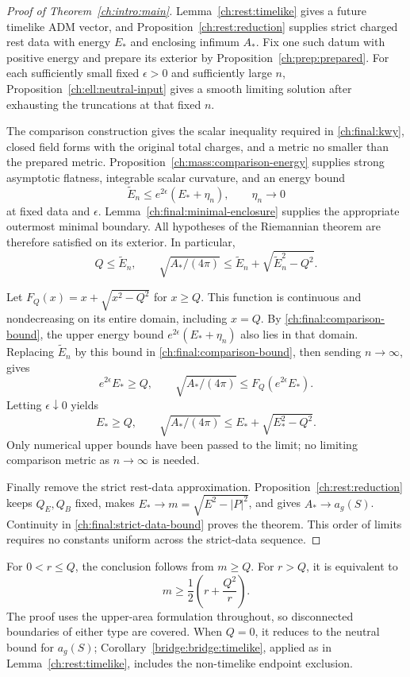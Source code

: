 \begin{proof}[Proof of Theorem~\ref{ch:intro:main}]
Lemma~\ref{ch:rest:timelike} gives a future timelike ADM vector, and
Proposition~\ref{ch:rest:reduction} supplies strict charged rest data
with energy $E_*$ and enclosing infimum $A_*$. Fix one such datum with positive energy and prepare its exterior by Proposition~\ref{ch:prep:prepared}. For each sufficiently small fixed $\epsilon>0$ and sufficiently large $n$, Proposition~\ref{ch:ell:neutral-input} gives a smooth limiting solution after exhausting the truncations at that fixed $n$.

The comparison construction gives the scalar inequality required in \eqref{ch:final:kwy}, closed field forms with the original total charges, and a metric no smaller than the prepared metric. Proposition~\ref{ch:mass:comparison-energy} supplies strong asymptotic flatness, integrable scalar curvature, and an energy bound
\[
 \widetilde E_n\le e^{2\epsilon}(E_*+\eta_n),
 \qquad \eta_n\longrightarrow0
\]
at fixed data and $\epsilon$. Lemma~\ref{ch:final:minimal-enclosure} supplies the appropriate outermost minimal boundary. All hypotheses of the Riemannian theorem are therefore satisfied on its exterior. In particular,
\begin{equation}\label{ch:final:comparison-bound}
 Q\le\widetilde E_n,\qquad
 \sqrt{A_*/(4\pi)}
 \le\widetilde E_n+\sqrt{\widetilde E_n^2-Q^2}.
\end{equation}

Let $F_Q(x)=x+\sqrt{x^2-Q^2}$ for $x\ge Q$. This function is continuous and nondecreasing on its entire domain, including $x=Q$. By \eqref{ch:final:comparison-bound}, the upper energy bound
$e^{2\epsilon}(E_*+\eta_n)$ also lies in that domain. Replacing $\widetilde E_n$ by this bound in \eqref{ch:final:comparison-bound}, then sending $n\to\infty$, gives
\[
 e^{2\epsilon}E_*\ge Q,\qquad
 \sqrt{A_*/(4\pi)}\le F_Q(e^{2\epsilon}E_*).
\]
Letting $\epsilon\downarrow0$ yields
\begin{equation}\label{ch:final:strict-data-bound}
 E_*\ge Q,\qquad
 \sqrt{A_*/(4\pi)}\le E_*+\sqrt{E_*^2-Q^2}.
\end{equation}
Only numerical upper bounds have been passed to the limit; no limiting comparison metric as $n\to\infty$ is needed.

Finally remove the strict rest-data approximation. Proposition~\ref{ch:rest:reduction} keeps $Q_E,Q_B$ fixed, makes $E_*\to m=\sqrt{E^2-|P|^2}$, and gives $A_*\to a_g(S)$. Continuity in \eqref{ch:final:strict-data-bound} proves the theorem. This order of limits requires no constants uniform across the strict-data sequence.
\end{proof}

\begin{remark}
For $0<r\le Q$, the conclusion follows from $m\ge Q$. For $r>Q$, it is equivalent to
\[
 m\ge\frac12\left(r+\frac{Q^2}{r}\right).
\]
The proof uses the upper-area formulation throughout, so disconnected boundaries of either type are covered. When $Q=0$, it reduces to the neutral bound for $a_g(S)$;
Corollary~\ref{bridge:bridge:timelike}, applied as in
Lemma~\ref{ch:rest:timelike}, includes the non-timelike endpoint exclusion.
\end{remark}
